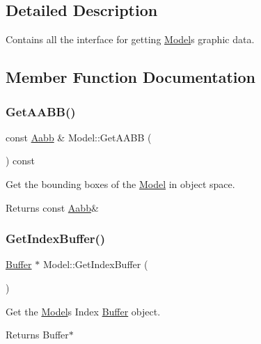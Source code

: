 \subsection{Detailed Description}
Contains all the interface for getting \hyperlink{classModel}{Model}\textquotesingle{}s graphic data. 

\subsection{Member Function Documentation}
\mbox{\label{classModel_a3dd43b49bf52682994f40fa7303bcf20}} 
\subsubsection{\texorpdfstring{Get\+A\+A\+B\+B()}{GetAABB()}}
{\footnotesize\ttfamily const \hyperlink{classAabb}{Aabb} \& Model\+::\+Get\+A\+A\+BB (\begin{DoxyParamCaption}{ }\end{DoxyParamCaption}) const}



Get the bounding boxes of the \hyperlink{classModel}{Model} in object space. 

\begin{DoxyReturn}{Returns}
const \hyperlink{classAabb}{Aabb}\& 
\end{DoxyReturn}
\mbox{\label{classModel_a22b66b76c6f8e17f9239d500ff03d09f}} 
\subsubsection{\texorpdfstring{Get\+Index\+Buffer()}{GetIndexBuffer()}}
{\footnotesize\ttfamily \hyperlink{classBuffer}{Buffer} $\ast$ Model\+::\+Get\+Index\+Buffer (\begin{DoxyParamCaption}{ }\end{DoxyParamCaption})}



Get the \hyperlink{classModel}{Model}\textquotesingle{}s Index \hyperlink{classBuffer}{Buffer} object. 

\begin{DoxyReturn}{Returns}
Buffer$\ast$ 
\end{DoxyReturn}
\mbox{\label{classModel_a6a2d8f9eddca5db21295de9c90b87421}} 
